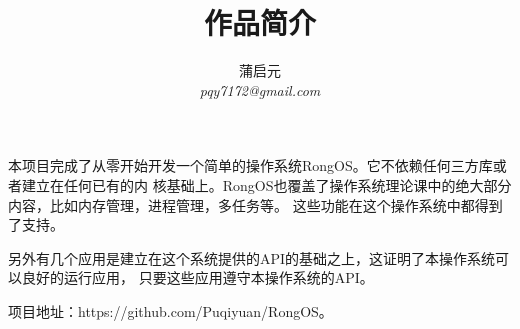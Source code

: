 \documentclass{wx672article} %
\title{作品简介}
\author{蒲启元 \\
\emph{pqy7172@gmail.com}}
\begin{document}
\maketitle{}
本项目完成了从零开始开发一个简单的操作系统RongOS。它不依赖任何三方库或者建立在任何已有的内
核基础上。RongOS也覆盖了操作系统理论课中的绝大部分内容，比如内存管理，进程管理，多任务等。
这些功能在这个操作系统中都得到了支持。

另外有几个应用是建立在这个系统提供的API的基础之上，这证明了本操作系统可以良好的运行应用，
只要这些应用遵守本操作系统的API。

项目地址：https://github.com/Puqiyuan/RongOS。
\end{document}
